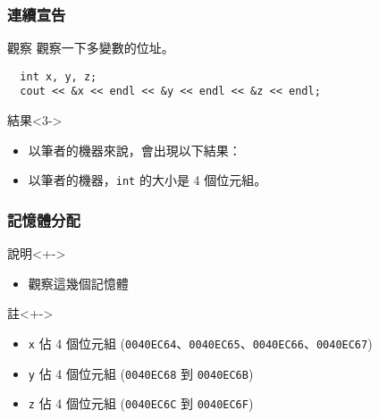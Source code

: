 \documentclass[utf8]{beamer}
\begin{document}
\begin{CJK}{UTF8}{bkai}
\begin{frame}[fragile]
  \frametitle{連續宣告}
  \begin{block}{觀察}
  觀察一下多變數的位址。
  \pause
  \begin{lstlisting}
  int x, y, z;
  cout << &x << endl << &y << endl << &z << endl;
  \end{lstlisting}
  \end{block}
  \begin{exampleblock}{結果}<3->
    \begin{itemize}
    \item 以筆者的機器來說，會出現以下結果：
    \item<6-> 以筆者的機器，\lstinline{int}{} 的大小是 \alert{4} 個位元組。
    \end{itemize}
  \end{exampleblock}
\end{frame}

\begin{frame}
  \frametitle{記憶體分配}
  \begin{block}{說明}<+->
    \begin{itemize}
    \item 觀察這幾個記憶體
    \end{itemize}
  \end{block}
  \begin{exampleblock}{註}<+->
    \begin{itemize}
    \item \texttt{x} 佔 4 個位元組 (\texttt{0040EC64}、\texttt{0040EC65}、\texttt{0040EC66}、\texttt{0040EC67})
    \item<+-> \texttt{y} 佔 4 個位元組 (\texttt{0040EC68} 到 \texttt{0040EC6B})
    \item<+-> \texttt{z} 佔 4 個位元組 (\texttt{0040EC6C} 到 \texttt{0040EC6F})
    \end{itemize}
  \end{exampleblock}
\end{frame}


\end{CJK}
\end{document}
